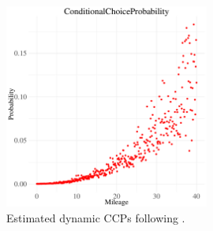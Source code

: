 \documentclass[12pt]{article}[margin=1in]
\begin{document}
\begin{figure}
    \centering
    \includegraphics[width=0.6\textwidth]{../Figures/ccp_dynamic.pdf}
    \caption{Estimated dynamic CCPs following \citet{bajari2007estimating}.}
    \label{fig:ccp_dynamic}
\end{figure}



\end{document}
